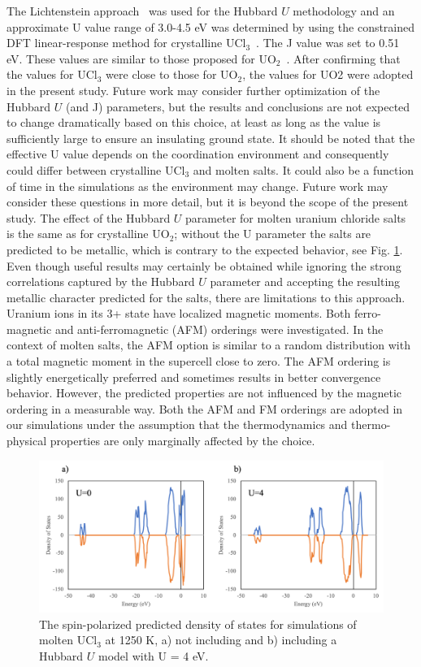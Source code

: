 \documentclass[preprint,3p,10pt,twocolumn,number,sort&compress]{elsarticle}
\begin{document}
The Lichtenstein approach~\cite{} was used for the Hubbard $U$  methodology and an approximate U value range of  3.0-4.5 eV was determined by using the constrained DFT linear-response method for crystalline UCl$_3$~\cite{}. The J value was set to 0.51 eV. These values are similar to those proposed for UO$_2$~\cite{}. After confirming that the values for UCl$_3$ were close to those for UO$_2$, the values for UO2 were adopted in the present study. Future work may consider further optimization of the Hubbard $U$  (and J) parameters, but the results and conclusions are not expected to change dramatically based on this choice, at least as long as the value is sufficiently large to ensure an insulating ground state. It should be noted that the effective U value depends on the coordination environment and consequently could differ between crystalline UCl$_3$ and molten salts. It could also be a function of time in the simulations as the environment may change. Future work may consider these questions in more detail, but it is beyond the scope of the present study. The effect of the Hubbard $U$  parameter for molten uranium chloride salts is the same as for crystalline UO$_2$; without the U parameter the salts are predicted to be metallic, which is contrary to the expected behavior, see Fig. \ref{fig:DOS}. Even though useful results may certainly be obtained while ignoring the strong correlations captured by the Hubbard $U$  parameter and accepting the resulting metallic character predicted for the salts, there are limitations to this approach. Uranium ions in its 3+ state have localized magnetic moments. Both ferro-magnetic and anti-ferromagnetic (AFM) orderings were investigated. In the context of molten salts, the AFM option is similar to a random distribution with a total magnetic moment in the supercell close to zero. The AFM ordering is slightly energetically preferred and sometimes results in better convergence behavior. However, the predicted properties are not influenced by the magnetic ordering in a measurable way.  Both the AFM and FM orderings are adopted in our simulations under the assumption that the thermodynamics and thermo-physical properties are only marginally affected by the choice.  


\begin{figure}[htb]
\centering
\includegraphics[width=\columnwidth]{figure2.png}
\caption{The spin-polarized predicted density of states for simulations of molten UCl$_3$ at 1250 K, a) not including and b) including a Hubbard $U$ model with U = 4 eV.} 
\label{fig:DOS}
\end{figure}
\end{document}
